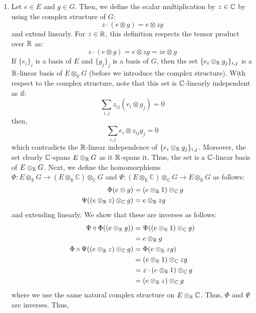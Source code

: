 \documentclass[12pt]{article}
\begin{document}
\begin{solution}
    \bbni
    \begin{enumerate}
        \item Let $e \in E$ and $g \in G$. Then, we define the scalar multiplication by $z \in \mathbb C$ by using the complex structure of $G$: 
        \[ z\cdot (e \otimes g) = e \otimes zg \]
        and extend linearly. For $z \in \mathbb R$, this definition respects the tensor product over $\mathbb R$ as:
        \[ z \cdot (e \otimes g ) = e \otimes zg = ze \otimes g\]
        If $\{e_i\}_i$ is a basis of $E$ and $\{g_j\}_j$ is a basis of $G$, then the set $\{e_i \otimes_\mathbb R g_j\}_{i,j}$ is a $\mathbb R$-linear basis of $E \otimes_{\mathbb{R}} G$ (before we introduce the complex structure). With respect to the complex structure, note that this set is $\mathbb C$-linearly independent as if: 
        \[\sum_{i,j} z_{ij} (e_i \otimes g_j)= 0\]
        then, 
        \[ \sum_{i,j}  e_i \otimes z_{ij}g_j = 0\]
        which contradicts the $\mathbb R$-linear independence of $\{e_i \otimes_\mathbb R g_j\}_{i,j}$. Moreover, the set clearly $\mathbb C$-spans $E \otimes_\mathbb R G$ as it $\mathbb R$-spans it. Thus, the set is a $\mathbb C$-linear basis of $E \otimes_\mathbb R G$. \bbni
        Next, we define the homomorphisms $\Phi: E \otimes_{\mathbb{R}} G \to (E \otimes_{\mathbb{R}} \mathbb{C}) \otimes_{\mathbb{C}} G$ and $\Psi: (E \otimes_{\mathbb{R}} \mathbb{C}) \otimes_{\mathbb{C}} G \to E \otimes_{\mathbb{R}} G$ as follows:
        \begin{align*}
            \Phi(e \otimes g) &= (e \otimes_\mathbb R 1) \otimes_\mathbb C g \\
            \Psi((e \otimes_\mathbb R z) \otimes_\mathbb C g) &= e \otimes_\mathbb R zg
        \end{align*}
        and extending linearly. We show that these are inverses as follows: 
        \begin{align*}
            \Psi \circ \Phi((e \otimes_\mathbb R g)) &= \Psi((e \otimes_\mathbb R 1) \otimes_\mathbb C g) \\
            &= e \otimes_\mathbb R g \\
            \Phi \circ \Psi((e \otimes_\mathbb R z) \otimes_\mathbb C g) &= \Phi(e \otimes_\mathbb R zg) \\
            &= (e \otimes_\mathbb R 1) \otimes_\mathbb C zg \\
            &= z\cdot (e \otimes_\mathbb R 1) \otimes_\mathbb C g \\
            &= (e \otimes_\mathbb R z) \otimes_\mathbb C g
        \end{align*}
        where we use the same natural complex structure on $E \otimes_\mathbb R \mathbb C$. Thus, $\Phi$ and $\Psi$ are inverses. Thus, 

\end{enumerate}
\end{solution}
\end{document}
